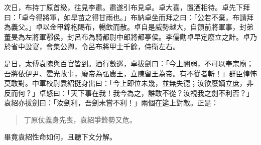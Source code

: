 次日，布持丁原首級，往見李肅。肅遂引布見卓。卓大喜，置酒相待。卓先下拜曰：「卓今得將軍，如旱苗之得甘雨也。」布納卓坐而拜之曰：「公若不棄，布請拜為義父。」卓以金甲錦袍賜布，暢飲而散。卓自是威勢越大，自領前將軍事，封弟董旻為左將軍鄠侯，封呂布為騎都尉中郎將都亭侯。李儒勸卓早定廢立之計。卓乃於省中設宴，會集公卿，令呂布將甲士千餘，侍衛左右。

是日，太傅袁隗與百官皆到。酒行數巡，卓拔劍曰：「今上闇弱，不可以奉宗廟；吾將依伊尹、霍光故事，廢帝為弘農王，立陳留王為帝。有不從者斬！」群臣惶怖莫敢對。中軍校尉袁紹挺身出曰：「今上即位未幾，並無失德；汝欲廢嫡立庶，非反而何？」卓怒曰：「天下事在我！我今為之，誰敢不從？汝視我之劍不利否？」袁紹亦拔劍曰：「汝劍利，吾劍未嘗不利！」兩個在筵上對敵。正是：

\begin{quote}
丁原仗義身先喪，袁紹爭鋒勢又危。
\end{quote}

畢竟袁紹性命如何，且聽下文分解。
